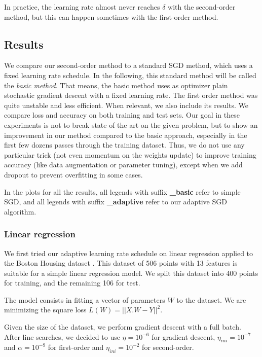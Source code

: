 \documentclass{article}
\begin{document}
  In practice, the learning rate almost never reaches $\delta$ with the second-order method, but this can happen sometimes with the first-order method. 
  
  \subsection{Results} 
  
  We compare our second-order method to a standard SGD method, which uses a fixed learning rate schedule. In the following, this standard method will be called the \emph{basic method}. That means, the basic method uses as optimizer plain stochastic gradient descent with a fixed learning rate. The first order method was quite unstable and less efficient. When relevant, we also include its results. We compare loss and accuracy on both training and test sets. Our goal in these experiments is not to break state of the art on the given problem, but to show an improvement in our method compared to the basic approach, especially in the first few dozens passes through the training dataset. Thus, we do not use any particular trick (not even momentum on the weights update) to improve training accuracy (like data augmentation or parameter tuning), except when we add dropout to prevent overfitting in some cases.
  
  In the plots for all the results, all legends with suffix \textbf{\_basic} refer to simple SGD, and all legends with suffix \textbf{\_adaptive} refer to our adaptive SGD algorithm.
  
  \subsubsection{Linear regression}
  
  We first tried our adaptive learning rate schedule on linear regression applied to the Boston Housing dataset \cite{boston}. This dataset of 506 points with 13 features is suitable for a simple linear regression model. We split this dataset into 400 points for training, and the remaining 106 for test.
  
  The model consists in fitting a vector of parameters $W$ to the dataset. We are minimizing the square loss $L(W)=||X.W-Y||^{2}$.
  
  Given the size of the dataset, we perform gradient descent with a full batch. After line searches, we decided to use $\eta=10^{-6}$ for gradient descent, $\eta_{ini} = 10^{-7}$ and $\alpha = 10^{-9}$ for first-order and $\eta_{ini}=10^{-2}$ for second-order.
\end{document}
